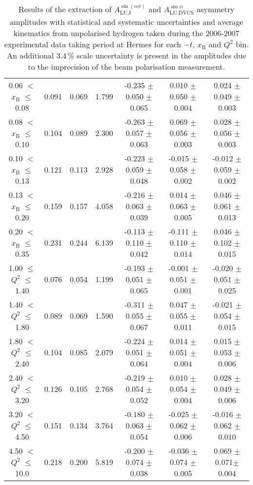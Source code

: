 \begin{table}[width=15cm]
\begin{center}
{\begin{tabular}{|c|c|c|c|c|c|c|}
0.06 $<$ $x_{\textrm{B}}$ $\leqslant$ 0.08 &  0.091 & 0.069 &  1.799 &  -0.235  $\pm$  0.050  $\pm$   0.065 &
0.010 $\pm$  0.050  $\pm$   0.004 & 0.024 $\pm$   0.049  $\pm$   0.003\\
0.08 $<$ $x_{\textrm{B}}$ $\leqslant$ 0.10 &  0.104 & 0.089 &  2.300 &  -0.263 $\pm$  0.057  $\pm$   0.063 &
0.069 $\pm$   0.056  $\pm$   0.003 & 0.028  $\pm$  0.056  $\pm$   0.003\\
0.10 $<$ $x_{\textrm{B}}$ $\leqslant$ 0.13 &  0.121 &  0.113 &  2.928 &  -0.223  $\pm$  0.059   $\pm$  0.048 & 
-0.015  $\pm$  0.058  $\pm$   0.002 & -0.012  $\pm$  0.059  $\pm$   0.002\\
0.13 $<$ $x_{\textrm{B}}$ $\leqslant$ 0.20 &  0.159 & 0.157 &  4.058&  -0.216  $\pm$  0.063  $\pm$   0.039 &
0.014  $\pm$  0.063  $\pm$   0.005 & 0.046  $\pm$  0.061  $\pm$   0.013 \\
0.20 $<$ $x_{\textrm{B}}$ $\leqslant$ 0.35 &  0.231 & 0.244 &  6.139 &  -0.113 $\pm$ 0.110  $\pm$   0.042 &
-0.111  $\pm$  0.110 $\pm$    0.014 & 0.046  $\pm$  0.102  $\pm$  0.015\\
\hline
1.00 $\leqslant$ $Q^{2}$ $\leqslant$ 1.40 &  0.076 & 0.054  & 1.199 &  -0.193  $\pm$  0.051  $\pm$   0.065 &
-0.001 $\pm$   0.051  $\pm$   0.001 & -0.020  $\pm$  0.051   $\pm$  0.025 \\
1.40 $<$ $Q^{2}$ $\leqslant$ 1.80 &  0.089 & 0.069 &  1.590 &  -0.311 $\pm$  0.055  $\pm$   0.067 &
0.047  $\pm$  0.055  $\pm$   0.011 & -0.021 $\pm$   0.054  $\pm$   0.015\\
1.80 $<$ $Q^{2}$ $\leqslant$ 2.40 &  0.104 & 0.085 &  2.079 &  -0.224 $\pm$   0.051  $\pm$   0.064 &
0.014 $\pm$   0.051  $\pm$   0.004 & 0.015  $\pm$  0.053  $\pm$   0.006\\
2.40 $<$ $Q^{2}$ $\leqslant$ 3.20 &  0.126 & 0.105  & 2.768 &  -0.219 $\pm$   0.054  $\pm$   0.052 &
0.010  $\pm$  0.054 $\pm$    0.004 & 0.028   $\pm$ 0.049  $\pm$   0.006\\
3.20 $<$ $Q^{2}$ $\leqslant$ 4.50 &  0.151 & 0.134 &  3.764 &  -0.180 $\pm$   0.063  $\pm$   0.054 &
-0.025  $\pm$  0.062 $\pm$    0.006 & -0.016 $\pm$   0.062  $\pm$   0.010\\
4.50 $<$ $Q^{2}$ $\leqslant$ 10.0 &  0.218 & 0.200 &  5.819 &  -0.200  $\pm$  0.074 $\pm$    0.038 &
-0.036  $\pm$  0.074  $\pm$   0.005 & 0.069 $\pm$  0.071$ \pm$  0.004\\
\hline
  \end{tabular}
}
 \end{center}
\caption{Results of the extraction of $A_{\textrm{LU,I}}^{\sin(n\phi)}$ and $A_{\textrm{LU,DVCS}}^{\sin \phi}$ asymmetry amplitudes with statistical and systematic uncertainties and average kinematics from unpolarised hydrogen taken during
the 2006-2007 experimental data taking period at H{\sc ermes} for each $-t$, $x_{\textrm{B}}$ and $Q^{2}$ bin.
An additional 3.4\,\% scale uncertainty is present in the amplitudes due to the imprecision of
the beam polarisation measurement.}
\end{table}

